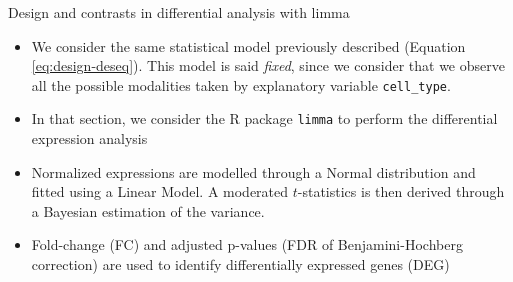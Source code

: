 \begin{info}{Design and contrasts in differential analysis with limma}

\begin{itemize}
\item
  We consider the same statistical model previously described (Equation \eqref{eq:design-deseq}). This model is said \emph{fixed}, since we consider that we observe all the possible modalities taken by explanatory variable \texttt{cell\_type}.
\item
  In that section, we consider the R package \texttt{limma} to perform the differential expression analysis
\item
  Normalized expressions are modelled through a Normal distribution and fitted using a Linear Model. A moderated \(t\)-statistics is then derived through a Bayesian estimation of the variance.
\item
  Fold-change (FC) and adjusted p-values (FDR of Benjamini-Hochberg correction) are used to identify differentially expressed genes (DEG)
\end{itemize}

\end{info}


